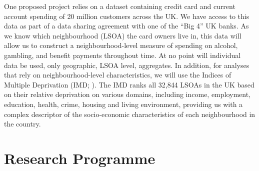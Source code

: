 \documentclass[11pt, a4paper]{article}
\begin{document}


One proposed project relies on a dataset containing credit card and current account spending of 20 million customers across the UK. We have access to this data as part of a data sharing agreement with one of the ``Big 4''  UK banks. As we know which neighbourhood (LSOA) the card owners live in, this data will allow us to construct a neighbourhood-level measure of spending on alcohol, gambling, and benefit payments throughout time. At no point will individual data be used, only geographic, LSOA level, aggregates. In addition, for analyses that rely on neighbourhood-level characteristics, we will use the Indices of Multiple Deprivation (IMD; ). The IMD ranks all 32,844 LSOAs in the UK based on their relative deprivation on various domains, including income, employment, education, health, crime, housing and living environment, providing us with a complex descriptor of the socio-economic characteristics of each neighbourhood in the country.



\section{Research Programme}
\end{document}
